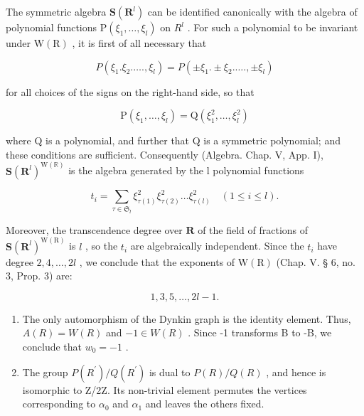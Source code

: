 The symmetric algebra \(\mathbf{S}(\mathbf{R}^{l})\) can be identified canonically with the algebra of polynomial functions \(\mathrm{P}(\xi_{1},\ldots,\xi_{l})\) on \(R^{l}\) . For such a polynomial to be invariant under \(\mathrm{W}(\mathrm{R})\) , it is first of all necessary that

\[
P \left(\xi_ {1}. \xi_ {2}. \dots ., \xi_ {l}\right) = P \left(\pm \xi_ {1}. \pm \xi_ {2}. \dots ., \pm \xi_ {l}\right)
\]

for all choices of the signs on the right-hand side, so that

\[
\mathrm{P} \left(\xi_ {1}, \dots , \xi_ {l}\right) = \mathrm{Q} \left(\xi_ {1} ^ {2}, \dots , \xi_ {l} ^ {2}\right)
\]

where Q is a polynomial, and further that Q is a symmetric polynomial; and these conditions are sufficient. Consequently (Algebra. Chap. V, App. I), \(\mathbf{S}(\mathbf{R}^{l})^{\mathrm{W}(\mathbb{R})}\) is the algebra generated by the l polynomial functions

\[
t _ {i} = \sum_ {\tau \in \mathfrak {S} _ {l}} \xi_ {\tau (1)} ^ {2} \xi_ {\tau (2)} ^ {2} \dots \xi_ {\tau (l)} ^ {2} \quad (1 \leqslant i \leqslant l).
\]

Moreover, the transcendence degree over \(\mathbf{R}\) of the field of fractions of \(\mathbf{S}(\mathbf{R}^l)^{\mathrm{W(R)}}\) is \(l\) , so the \(t_i\) are algebraically independent. Since the \(t_i\) have degree \(2,4,\ldots ,2l\) , we conclude that the exponents of \(\mathrm{W(R)}\) (Chap. V. § 6, no. 3, Prop. 3) are:

\[
1, 3, 5, \dots , 2 l - 1.
\]

\begin{enumerate}
\def\labelenumi{(\Roman{enumi})}
\setcounter{enumi}{10}
\item
  The only automorphism of the Dynkin graph is the identity element. Thus, \(A(R) = W(R)\) and \(-1 \in W(R)\) . Since -1 transforms B to -B, we conclude that \(w_{0} = -1\) .
\item
  The group \(P(R^{\prime})/Q(R^{\prime})\) is dual to \(P(R)/Q(R)\) , and hence is isomorphic to Z/2Z. Its non-trivial element permutes the vertices corresponding to \(\alpha_{0}\) and \(\alpha_{1}\) and leaves the others fixed.
\end{enumerate}
\relax{}

